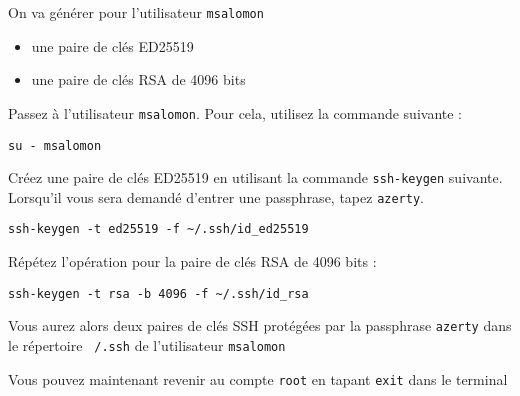 On va générer pour l'utilisateur \texttt{msalomon}
\begin{itemize}
\item une paire de clés ED25519
\item une paire de clés RSA de 4096 bits
\end{itemize}

Passez à l'utilisateur \texttt{msalomon}. Pour cela, utilisez la commande suivante :

\begin{lstlisting}
su - msalomon
\end{lstlisting}

Créez une paire de clés ED25519 en utilisant la commande \texttt{ssh-keygen} suivante. Lorsqu'il vous sera demandé d'entrer une passphrase, tapez \texttt{azerty}.
\begin{lstlisting}
ssh-keygen -t ed25519 -f ~/.ssh/id_ed25519
\end{lstlisting}

Répétez l'opération pour la paire de clés RSA de 4096 bits :
\begin{lstlisting}
ssh-keygen -t rsa -b 4096 -f ~/.ssh/id_rsa
\end{lstlisting}

Vous aurez alors deux paires de clés SSH protégées par la passphrase \texttt{azerty} dans le répertoire \texttt{~/.ssh} de l'utilisateur \texttt{msalomon}

Vous pouvez maintenant revenir au compte \texttt{root} en tapant \texttt{exit} dans le terminal